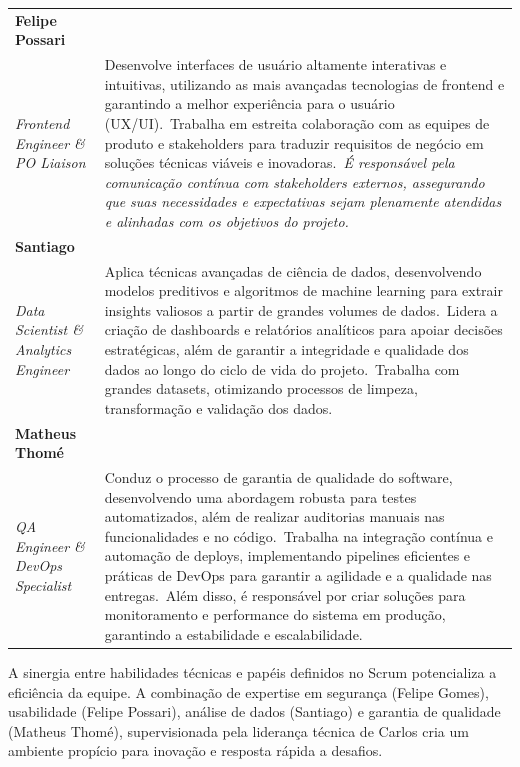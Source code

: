 \documentclass[a4paper, 12pt]{article}
\begin{document}
\begin{longtable}[c]{@{} >{\raggedright\arraybackslash}p{4.5cm}>{\raggedright\arraybackslash}p{11cm} @{}}
\textbf{Felipe Possari} \\ \textit{Frontend Engineer \& PO Liaison} &
  Desenvolve interfaces de usuário altamente interativas e intuitivas, utilizando as mais avançadas tecnologias de frontend e garantindo a melhor experiência para o usuário (UX/UI).\
  Trabalha em estreita colaboração com as equipes de produto e stakeholders para traduzir requisitos de negócio em soluções técnicas viáveis e inovadoras.\
  \textit{É responsável pela comunicação contínua com stakeholders externos, assegurando que suas necessidades e expectativas sejam plenamente atendidas e alinhadas com os objetivos do projeto.} \\

\textbf{Santiago} \\ \textit{Data Scientist \& Analytics Engineer} &
  Aplica técnicas avançadas de ciência de dados, desenvolvendo modelos preditivos e algoritmos de machine learning para extrair insights valiosos a partir de grandes volumes de dados.\
  Lidera a criação de dashboards e relatórios analíticos para apoiar decisões estratégicas, além de garantir a integridade e qualidade dos dados ao longo do ciclo de vida do projeto.\
  Trabalha com grandes datasets, otimizando processos de limpeza, transformação e validação dos dados. \\

\textbf{Matheus Thomé} \\ \textit{QA Engineer \& DevOps Specialist} &
  Conduz o processo de garantia de qualidade do software, desenvolvendo uma abordagem robusta para testes automatizados, além de realizar auditorias manuais nas funcionalidades e no código.\
  Trabalha na integração contínua e automação de deploys, implementando pipelines eficientes e práticas de DevOps para garantir a agilidade e a qualidade nas entregas.\
  Além disso, é responsável por criar soluções para monitoramento e performance do sistema em produção, garantindo a estabilidade e escalabilidade. \\

\end{longtable}

A sinergia entre habilidades técnicas e papéis definidos no Scrum potencializa a eficiência da equipe. A combinação de expertise em segurança (Felipe Gomes), usabilidade (Felipe Possari), análise de dados (Santiago) e garantia de qualidade (Matheus Thomé), supervisionada pela liderança técnica de Carlos cria um ambiente propício para inovação e resposta rápida a desafios.
\end{document}
